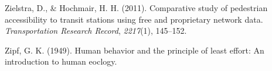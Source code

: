 \documentclass[12pt,twoside]{reedthesis}
\newlength{\cslhangindent}
\newenvironment{CSLReferences}[2] %
 {%
  \setlength{\parindent}{0pt}
  \ifodd #1 \everypar{\setlength{\hangindent}{\cslhangindent}}\ignorespaces\fi
  \ifnum #2 > 0
  \setlength{\parskip}{#2\baselineskip}
  \fi
 }%
 {}
\begin{document}
\begin{CSLReferences}{1}{0}
\leavevmode{}%
Zielstra, D., \& Hochmair, H. H. (2011). Comparative study of pedestrian accessibility to transit stations using free and proprietary network data. \emph{Transportation Research Record}, \emph{2217}(1), 145--152.

\leavevmode{}%
Zipf, G. K. (1949). Human behavior and the principle of least effort: An introduction to human eoclogy.

\end{CSLReferences}

\end{document}

